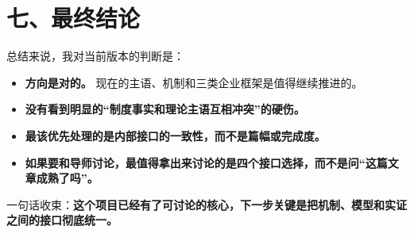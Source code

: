\documentclass[12pt]{ctexart}
\begin{document}
\section*{七、最终结论}

总结来说，我对当前版本的判断是：

\begin{itemize}
\item \textbf{方向是对的。} 现在的主语、机制和三类企业框架是值得继续推进的。
\item \textbf{没有看到明显的“制度事实和理论主语互相冲突”的硬伤。}
\item \textbf{最该优先处理的是内部接口的一致性，而不是篇幅或完成度。}
\item \textbf{如果要和导师讨论，最值得拿出来讨论的是四个接口选择，而不是问“这篇文章成熟了吗”。}
\end{itemize}

一句话收束：\textbf{这个项目已经有了可讨论的核心，下一步关键是把机制、模型和实证之间的接口彻底统一。}
\end{document}
